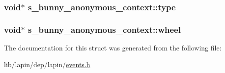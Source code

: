 \hypertarget{structs__bunny__anonymous__context_a96080593e8d4538622ae7162c9408d28}{
\subsubsection[{type}]{\setlength{\rightskip}{0pt plus 5cm}void$\ast$ s\-\_\-bunny\-\_\-anonymous\-\_\-context\-::type}}\label{structs__bunny__anonymous__context_a96080593e8d4538622ae7162c9408d28}
\hypertarget{structs__bunny__anonymous__context_a100036ec71cddf932a63cf5739875c96}{
\subsubsection[{wheel}]{\setlength{\rightskip}{0pt plus 5cm}void$\ast$ s\-\_\-bunny\-\_\-anonymous\-\_\-context\-::wheel}}\label{structs__bunny__anonymous__context_a100036ec71cddf932a63cf5739875c96}


The documentation for this struct was generated from the following file\-:\begin{DoxyCompactItemize}
\item 
lib/lapin/dep/lapin/\hyperlink{events_8h}{events.\-h}\end{DoxyCompactItemize}
